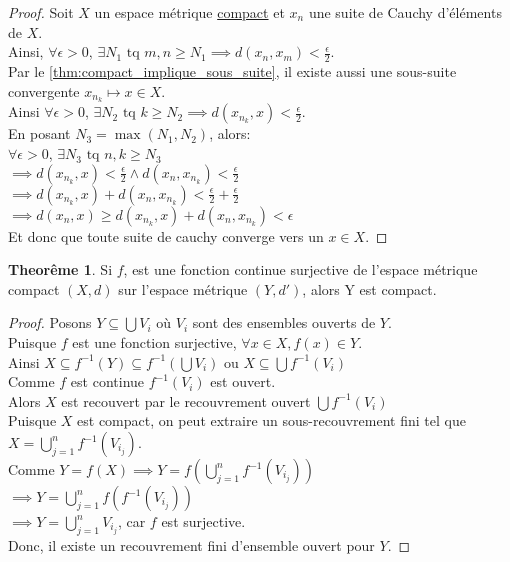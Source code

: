 \documentclass[12pt]{book}
\theoremstyle{definition}
\newtheorem{theorem}{Theorême}[section]
\begin{document}
\begin{proof}
    Soit $X$ un espace métrique \hyperref[def:completude]{compact} et ${x_n}$ une suite de Cauchy d'éléments de $X$.\\
    Ainsi, $\forall \epsilon > 0$, $\exists N_1\text{ tq } m,n \geq N_1 \implies d(x_n, x_m) < \frac{\epsilon}{2}$.\\
    Par le \autoref{thm:compact_implique_sous_suite},  il existe aussi une sous-suite convergente ${x_{n_k}} \mapsto x \in X$.\\
    Ainsi $\forall \epsilon > 0$, $\exists N_2\text{ tq } k \geq N_2 \implies d(x_{n_k}, x) < \frac{\epsilon}{2}$. \\
    En posant $N_3 = \max(N_1, N_2)$, alors:\\
    $\forall \epsilon > 0$, $\exists N_3\text{ tq } n,k \geq N_3$ \\
    $\implies d(x_{n_k}, x) < \frac{\epsilon}{2} \land d(x_n,x_{n_k}) < \frac{\epsilon}{2}$\\
    $\implies d(x_{n_k}, x) + d(x_n, x_{n_k}) < \frac{\epsilon}{2} + \frac{\epsilon}{2}$\\
    $\implies d(x_n,x) \geq d(x_{n_k}, x) + d(x_n, x_{n_k}) < \epsilon$\\
    Et donc que toute suite de cauchy converge vers un $x \in X$.
\end{proof}

\begin{theorem}
    Si $f$, est une fonction continue surjective de l'espace métrique compact $(X,d)$ sur l'espace métrique $(Y, d')$, alors Y est compact.
\end{theorem}
\begin{proof}
    Posons $Y \subseteq \bigcup{V_i}$ où $V_i$ sont des ensembles ouverts de $Y$. \\
    Puisque $f$ est une fonction surjective, $\forall x \in X, f(x) \in Y$.\\
    Ainsi $X \subseteq f^{-1}(Y) \subseteq f^{-1}(\bigcup{V_i})$ ou $X \subseteq \bigcup f^{-1}(V_i)$\\
    Comme $f$ est continue $f^{-1}(V_i)$ est ouvert.\\
    Alors $X$ est recouvert par le recouvrement ouvert $\bigcup f^{-1}(V_i)$\\
    Puisque $X$ est compact, on peut extraire un sous-recouvrement fini tel que $X = \bigcup^n_{j=1} f^{-1}(V_{i_j})$.\\
    Comme $Y = f(X) \implies Y = f(\bigcup^n_{j=1} f^{-1}(V_{i_j}))$ \\
    $ \implies Y = \bigcup^n_{j=1} f(f^{-1}(V_{i_j})) $\\
    $ \implies Y = \bigcup^n_{j=1} V_{i_j}$, car $f$ est surjective.\\
    Donc, il existe un recouvrement fini d'ensemble ouvert pour $Y$.
\end{proof}
\end{document}
